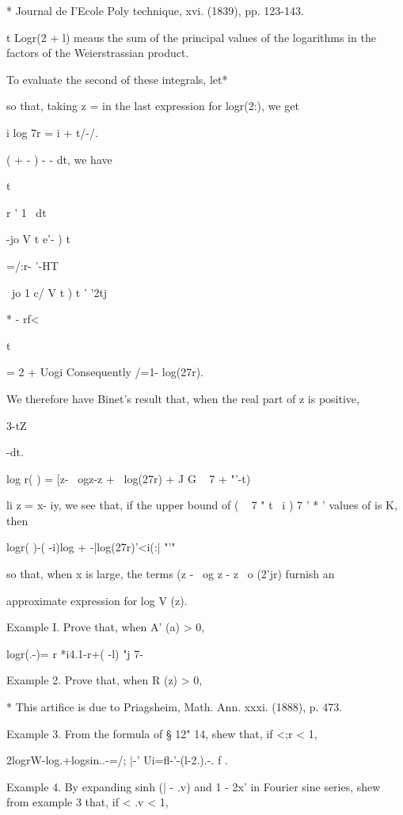 * Journal de I'Ecole Poly technique, xvi. (1839), pp. 123-143.

t Logr(2 + l) meaus the sum of the principal values of the logarithms
in the factors of the Weierstrassian product.

%
%

To evaluate the second of these integrals, let*

so that, taking z = in the last expression for logr(2:), we get

i log 7r = i + t/-/.

( + - ) - - dt, we have

t

r ' 1 \ dt

-jo V t e'- ) t 

=/:r- '-HT

~jo 1 c/ V t ) t ' '2tj

* - rf<

t

= 2 + Uogi Consequently /=1- log(27r).

We therefore have Binet's result that, when the real part of z is
positive,

3-tZ

 -dt.

log r( ) = [z- \ ogz-z + \ log(27r) + J G ~ 7 + "'-t)

li z = x- iy, we see that, if the upper bound of ( ~ 7 " t \ i ) 7 ' *
' values of is K, then

logr( )-( -i)log + -|log(27r)'<i(:| "'"

so that, when x is large, the terms (z - \ og z - z \ o (2'jr) furnish
an

approximate expression for log V (z).

Example I. Prove that, when A' (a) > 0,

logr(.-)= r *i4.1-r+( -l) "j 7- 

Example 2. Prove that, when R (z) > 0,

* This artifice is due to Priagsheim, Math. Ann. xxxi. (1888), p. 473.

%
%

Example 3. From the formula of § 12" 14, shew that, if <;r < 1,

2logrW-log.+logsin..-=/; |-' Ui=fl-'-(l-2.).-. f .


Example 4. By expanding sinh (| - .v) and 1 - 2x' in Fourier sine
series, shew from example 3 that, if < .v < 1,

